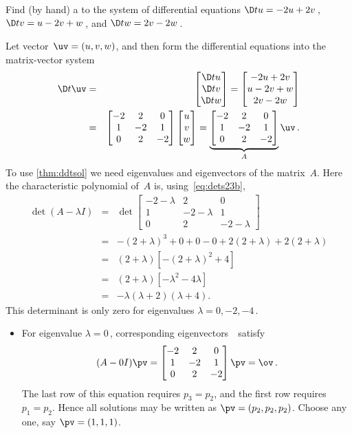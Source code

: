 \begin{example} \label{eg:de3t} 
Find (by hand) a  to the system of differential equations \(\D tu=-2u+2v\)\,, \(\D tv=u-2v+w\)\,, and \(\D tw=2v-2w\)\,.

\begin{solution} 
Let vector~\(\uv=(u,v,w)\), and then form the differential equations into the matrix-vector system
\begin{eqnarray*}
\D t\uv&=&\begin{bmatrix} \D tu\\\D tv\\\D t w \end{bmatrix}
=\begin{bmatrix} -2u+2v\\u-2v+w\\2v-2w \end{bmatrix}
\\&=&\begin{bmatrix} -2&2&0\\1&-2&1\\0&2&-2 \end{bmatrix}
\begin{bmatrix} u\\v\\w \end{bmatrix}
=\underbrace{\begin{bmatrix} -2&2&0\\1&-2&1\\0&2&-2 \end{bmatrix}}_A\uv\,.
\end{eqnarray*}
To use \autoref{thm:ddtsol} we need eigenvalues and eigenvectors of the matrix~\(A\).
Here the characteristic polynomial of~\(A\) is, using~\eqref{eq:dets23b},
\begin{eqnarray*}
\det(A-\lambda I)&=&\det\begin{bmatrix} -2-\lambda&2&0\\1&-2-\lambda&1\\0&2&-2-\lambda \end{bmatrix}
\\&=&-(2+\lambda)^3+0+0-0+2(2+\lambda)+2(2+\lambda)
\\&=&(2+\lambda)\left[-(2+\lambda)^2+4\right]
\\&=&(2+\lambda)[-\lambda^2-4\lambda]
\\&=&-\lambda(\lambda+2)(\lambda+4).
\end{eqnarray*}
This determinant is only zero for eigenvalues \(\lambda=0,-2,-4\)\,.
\begin{itemize}
\item For eigenvalue \(\lambda=0\)\,, corresponding eigenvectors~\pv\ satisfy
\begin{equation*}
(A-0I)\pv=\begin{bmatrix} -2&2&0\\1&-2&1\\0&2&-2 \end{bmatrix}\pv=\ov\,.
\end{equation*}
The last row of this equation requires \(p_3=p_2\), and the first row requires \(p_1=p_2\).
Hence all solutions may be written as \(\pv=(p_2,p_2,p_2)\).
Choose any one, say \(\pv=(1,1,1)\).


\end{itemize}
\end{solution}
\end{example}
